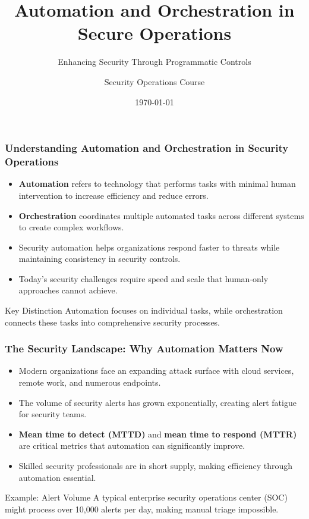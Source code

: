 \documentclass{beamer}
\title{Automation and Orchestration in Secure Operations}
\subtitle{Enhancing Security Through Programmatic Controls}
\author{Security Operations Course}
\date{\today}
\begin{document}
\begin{frame}
  \titlepage
\end{frame}

\begin{frame}
  \frametitle{Understanding Automation and Orchestration in Security Operations}
  
  \begin{itemize}
    \item \textbf{Automation} refers to technology that performs tasks with minimal human intervention to increase efficiency and reduce errors.
    \item \textbf{Orchestration} coordinates multiple automated tasks across different systems to create complex workflows.
    \item Security automation helps organizations respond faster to threats while maintaining consistency in security controls.
    \item Today's security challenges require speed and scale that human-only approaches cannot achieve.
  \end{itemize}
  
  \begin{alertblock}{Key Distinction}
    Automation focuses on individual tasks, while orchestration connects these tasks into comprehensive security processes.
  \end{alertblock}
\end{frame}

\begin{frame}
  \frametitle{The Security Landscape: Why Automation Matters Now}
  
  \begin{itemize}
    \item Modern organizations face an expanding attack surface with cloud services, remote work, and numerous endpoints.
    \item The volume of security alerts has grown exponentially, creating alert fatigue for security teams.
    \item \textbf{Mean time to detect (MTTD)} and \textbf{mean time to respond (MTTR)} are critical metrics that automation can significantly improve.
    \item Skilled security professionals are in short supply, making efficiency through automation essential.
  \end{itemize}
  
  \begin{exampleblock}{Example: Alert Volume}
    A typical enterprise security operations center (SOC) might process over 10,000 alerts per day, making manual triage impossible.
  \end{exampleblock}
\end{frame}
\end{document}
